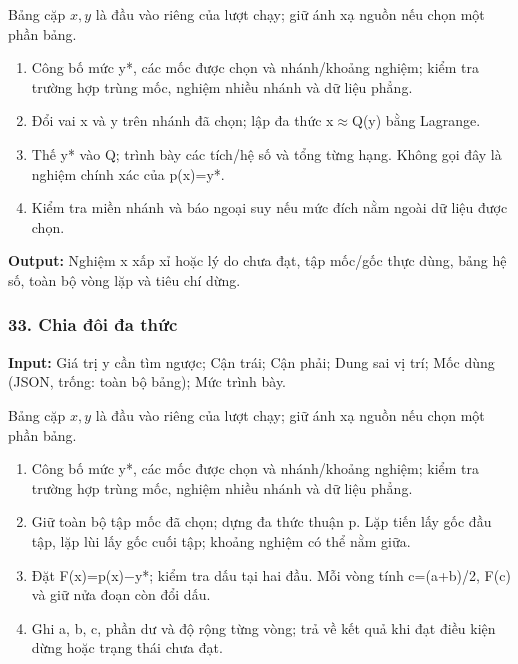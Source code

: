 Bảng cặp $x,y$ là đầu vào riêng của lượt chạy; giữ ánh xạ nguồn nếu chọn một phần bảng.

\begin{enumerate}

\item Công bố mức y*,\allowbreak{} các mốc được chọn và nhánh/\allowbreak{}khoảng nghiệm;\allowbreak{} kiểm tra trường hợp trùng mốc,\allowbreak{} nghiệm nhiều nhánh và dữ liệu phẳng.

\item Đổi vai x và y trên nhánh đã chọn;\allowbreak{} lập đa thức x\ensuremath{\approx}Q(\allowbreak{}y) bằng Lagrange.

\item Thế y* vào Q;\allowbreak{} trình bày các tích/\allowbreak{}hệ số và tổng từng hạng. Không gọi đây là nghiệm chính xác của p(\allowbreak{}x)=\allowbreak{}y*.

\item Kiểm tra miền nhánh và báo ngoại suy nếu mức đích nằm ngoài dữ liệu được chọn.

\end{enumerate}

\textbf{Output:} Nghiệm x xấp xỉ hoặc lý do chưa đạt,\allowbreak{} tập mốc/\allowbreak{}gốc thực dùng,\allowbreak{} bảng hệ số,\allowbreak{} toàn bộ vòng lặp và tiêu chí dừng.

\examplebreak\subsubsection*{33. Chia đôi đa thức}

\textbf{Input:} Giá trị y cần tìm ngược;\allowbreak{} Cận trái;\allowbreak{} Cận phải;\allowbreak{} Dung sai vị trí;\allowbreak{} Mốc dùng (\allowbreak{}JSON,\allowbreak{} trống: toàn bộ bảng);\allowbreak{} Mức trình bày.

Bảng cặp $x,y$ là đầu vào riêng của lượt chạy; giữ ánh xạ nguồn nếu chọn một phần bảng.

\begin{enumerate}

\item Công bố mức y*,\allowbreak{} các mốc được chọn và nhánh/\allowbreak{}khoảng nghiệm;\allowbreak{} kiểm tra trường hợp trùng mốc,\allowbreak{} nghiệm nhiều nhánh và dữ liệu phẳng.

\item Giữ toàn bộ tập mốc đã chọn;\allowbreak{} dựng đa thức thuận p. Lặp tiến lấy gốc đầu tập,\allowbreak{} lặp lùi lấy gốc cuối tập;\allowbreak{} khoảng nghiệm có thể nằm giữa.

\item Đặt F(\allowbreak{}x)=\allowbreak{}p(\allowbreak{}x)\ensuremath{-}y*;\allowbreak{} kiểm tra dấu tại hai đầu. Mỗi vòng tính c=\allowbreak{}(\allowbreak{}a+\allowbreak{}b)/\allowbreak{}2,\allowbreak{} F(\allowbreak{}c) và giữ nửa đoạn còn đổi dấu.

\item Ghi a,\allowbreak{} b,\allowbreak{} c,\allowbreak{} phần dư và độ rộng từng vòng;\allowbreak{} trả về kết quả khi đạt điều kiện dừng hoặc trạng thái chưa đạt.

\end{enumerate}

